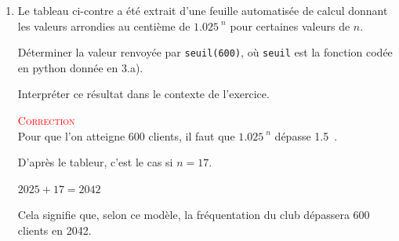 \documentclass[10pt]{article}
\providecommand{\np}[2][]{{#2~#1}}
\begin{document}
\begin{enumerate}
\begin{enumerate}
	\item
\begin{minipage}[t]{0.45\linewidth}\vspace{0mm}
Le tableau ci-contre a été extrait d'une feuille automatisée de calcul donnant les valeurs arrondies au centième de \mbox{$\np{1.025}^n$} pour certaines valeurs de $n$.

	\vspace{5mm}
	Déterminer la valeur renvoyée par \texttt{seuil(600)}, où \texttt{seuil} est la fonction codée en python donnée en 3.a).


		\vspace{5mm}
	Interpréter ce résultat dans le contexte de l'exercice.


		\vspace{5mm}
				\textcolor{red}{\textsc{Correction}}\\

				Pour que l'on atteigne 600 clients, il faut que \mbox{$\np{1.025}^n$} dépasse \np{1.5}.

				D'après le tableur, c'est le cas si \mbox{$n=17$}.

				$2025 + 17 = 2042$

				\vspace{5mm}
				Cela signifie que, selon ce modèle, la fréquentation du club dépassera 600 clients en 2042.
\end{minipage}\hspace{0.05\linewidth}\begin{minipage}[t]{0.35\linewidth}\vspace{0mm}


\end{minipage}
\end{enumerate}
\end{enumerate}
\end{document}
